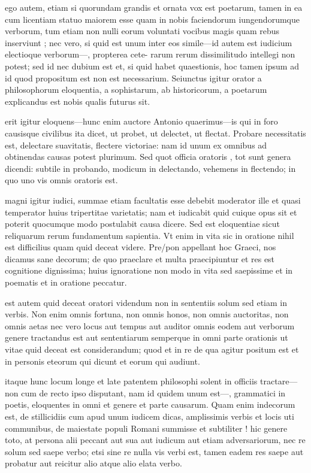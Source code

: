  ego autem, etiam si quorundam grandis et ornata vox est poetarum, tamen in ea cum licentiam statuo maiorem esse quam in nobis faciendorum iungendorumque verborum, tum etiam non nulli eorum voluntati vocibus magis quam rebus inserviunt ; nec vero, si quid est unum inter eos simile—id autem est iudicium electioque verborum—, propterea cete- rarum rerum dissimilitudo intellegi non potest; sed id nec dubium est et, si quid habet quaestionis, hoc tamen ipsum ad id quod propositum est non est necessarium. Seiunctus igitur orator a philosophorum eloquentia, a sophistarum, ab historicorum, a poetarum explicandus est nobis qualis futurus sit.

 erit igitur eloquens—hunc enim auctore Antonio quaerimus—is qui in foro causisque civilibus ita dicet, ut probet, ut delectet, ut flectat. Probare necessitatis est, delectare suavitatis, flectere victoriae: nam id unum ex omnibus ad obtinendas causas potest plurimum. Sed quot officia oratoris , tot sunt genera dicendi: subtile in probando, modicum in delectando, vehemens in flectendo; in quo uno vis omnis oratoris est.

 magni igitur iudici, summae etiam facultatis esse debebit moderator ille et quasi temperator huius tripertitae varietatis; nam et iudicabit quid cuique opus sit et poterit quocumque modo postulabit causa dicere. Sed est eloquentiae sicut reliquarum rerum fundamentum sapientia. Vt enim in vita sic in oratione nihil est difficilius quam quid deceat videre. Pre/pon appellant hoc Graeci, nos dicamus sane decorum; de quo praeclare et multa praecipiuntur et res est cognitione dignissima; huius ignoratione non modo in vita sed saepissime et in poematis et in oratione peccatur.

 est autem quid deceat oratori videndum non in sententiis solum sed etiam in verbis. Non enim omnis fortuna, non omnis honos, non omnis auctoritas, non omnis aetas nec vero locus aut tempus aut auditor omnis eodem aut verborum genere tractandus est aut sententiarum semperque in omni parte orationis ut vitae quid deceat est considerandum; quod et in re de qua agitur positum est et in personis eteorum qui dicunt et eorum qui audiunt.

 itaque hunc locum longe et late patentem philosophi solent in officiis tractare—non cum de recto ipso disputant, nam id quidem unum est—, grammatici in poetis, eloquentes in omni et genere et parte causarum. Quam enim indecorum est, de stillicidiis cum apud unum iudicem dicas, amplissimis verbis et locis uti communibus, de maiestate populi Romani summisse et subtiliter ! hic genere toto, at persona alii peccant aut sua aut iudicum aut etiam adversariorum, nec re solum sed saepe verbo; etsi sine re nulla vis verbi est, tamen eadem res saepe aut probatur aut reicitur alio atque alio elata verbo.


